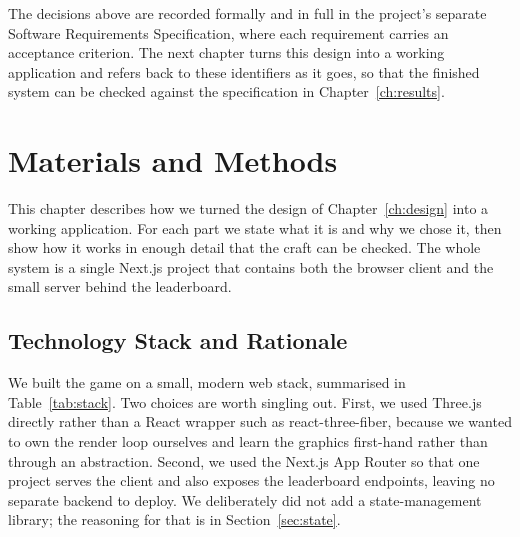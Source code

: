 \documentclass[12pt,a4paper]{report}
\begin{document}
The decisions above are recorded formally and in full in the project's separate
Software Requirements Specification, where each requirement carries an acceptance
criterion. The next chapter turns this design into a working application and
refers back to these identifiers as it goes, so that the finished system can be
checked against the specification in Chapter~\ref{ch:results}.

\chapter{Materials and Methods}\label{ch:methods}

This chapter describes how we turned the design of Chapter~\ref{ch:design} into
a working application. For each part we state what it is and why we chose it,
then show how it works in enough detail that the craft can be checked. The whole
system is a single Next.js project that contains both the browser client and the
small server behind the leaderboard.

\section{Technology Stack and Rationale}

We built the game on a small, modern web stack, summarised in
Table~\ref{tab:stack}. Two choices are worth singling out. First, we used
Three.js directly rather than a React wrapper such as react-three-fiber, because
we wanted to own the render loop ourselves and learn the graphics first-hand
rather than through an abstraction. Second, we used the Next.js App Router so
that one project serves the client and also exposes the leaderboard endpoints,
leaving no separate backend to deploy. We deliberately did not add a
state-management library; the reasoning for that is in Section~\ref{sec:state}.
\end{document}
